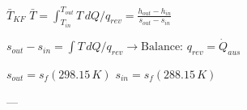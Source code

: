 \( \bar{T}_{KF} \)  
\( \bar{T} = \int_{T_{in}}^{T_{out}} T \, dQ / q_{rev} = \frac{h_{out} - h_{in}}{s_{out} - s_{in}} \)  

\( s_{out} - s_{in} = \int T \, dQ / q_{rev} \rightarrow \text{Balance: } q_{rev} = \dot{Q}_{aus} \)  

\( s_{out} = s_f (298.15 \, K) \)  
\( s_{in} = s_f (288.15 \, K) \)  

---